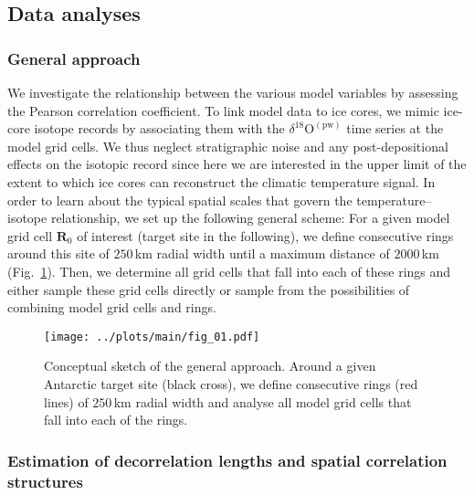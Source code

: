 \documentclass[cp, manuscript]{copernicus}
\begin{document}
\subsection{Data analyses}\label{methods:main}

\subsubsection{General approach}

We investigate the relationship between the various model variables by assessing
the Pearson correlation coefficient. To link model data to ice cores, we mimic
ice-core isotope records by associating them with the
$\delta^{18}\mathrm{O}^{\mathrm{(pw)}}$ time series at the model grid cells. We
thus neglect stratigraphic noise and any post-depositional effects on the
isotopic record since here we are interested in the upper limit of the extent to
which ice cores can reconstruct the climatic temperature signal. In order to
learn about the typical spatial scales that govern the temperature--isotope
relationship, we set up the following general scheme: For a given model grid
cell $\mathbf{R}_0$ of interest (target site in the following), we define
consecutive rings around this site of $250$\,km radial width until a maximum
distance of $2000$\,km (Fig.~\ref{fig:concept}). Then, we determine all grid
cells that fall into each of these rings and either sample these grid cells
directly or sample from the possibilities of combining model grid cells and
rings.

\begin{figure}[t]%
\centering
\texttt{[image: ../plots/main/fig\_01.pdf]}
\caption[Conceptual approach]{%
  Conceptual sketch of the general approach. Around a given Antarctic target
  site (black cross), we define consecutive rings (red lines) of $250$\,km
  radial width and analyse all model grid cells that fall into each of the
  rings.}
\label{fig:concept}%
\end{figure}%

\subsubsection{Estimation of decorrelation lengths and spatial correlation
  structures}\label{methods:decor.model}
\end{document}

